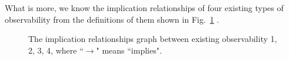 What is more, we know the implication relationships of four existing types of observability from the definitions of them shown in Fig.~\ref{fig:9} \cite{Zhang2016Observability}. 

 \begin{figure}[thpb]
      \centering
      
      \caption{The implication relationships graph between existing observability 1, 2, 3, 4, where ``$\rightarrow$" means ``implies".}
      \label{fig:9}
   \end{figure}

